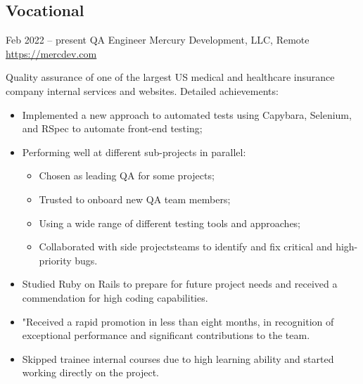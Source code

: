 \documentclass[11pt,a4paper,sans]{moderncv}
\begin{document}
\subsection{Vocational}
\cventry
{Feb 2022 -- present}
{QA Engineer}
{Mercury Development, LLC, Remote}
{\newline{}\url{https://mercdev.com}}{}
{Quality assurance of one of the largest US medical and healthcare insurance company internal services and websites. \newline{}
Detailed achievements:
\begin{itemize}
\item Implemented a new approach to automated tests using Capybara, Selenium, and RSpec to automate front-end testing;
\item Performing well at different sub-projects in parallel:
\begin{itemize}
\item Chosen as leading QA for some projects;
\item Trusted to onboard new QA team members;
\item Using a wide range of different testing tools and approaches;
\item Collaborated with side projectsteams to identify and fix critical and high-priority bugs.
\end{itemize}
\item Studied Ruby on Rails to prepare for future project needs and received a commendation for high coding capabilities.
\item "Received a rapid promotion in less than eight months, in recognition of exceptional performance and significant contributions to the team.
\item Skipped trainee internal courses due to high learning ability and started working directly on the project.
\end{itemize}}

\end{document}
